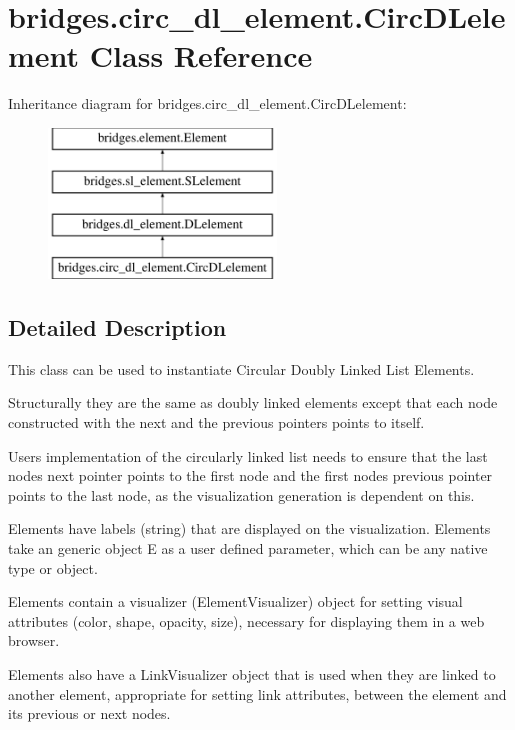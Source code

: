 \hypertarget{classbridges_1_1circ__dl__element_1_1_circ_d_lelement}{}\section{bridges.\+circ\+\_\+dl\+\_\+element.\+Circ\+D\+Lelement Class Reference}
\label{classbridges_1_1circ__dl__element_1_1_circ_d_lelement}
Inheritance diagram for bridges.\+circ\+\_\+dl\+\_\+element.\+Circ\+D\+Lelement\+:\begin{figure}[H]
\begin{center}
\leavevmode
\includegraphics[height=4.000000cm]{classbridges_1_1circ__dl__element_1_1_circ_d_lelement}
\end{center}
\end{figure}


\subsection{Detailed Description}
This class can be used to instantiate Circular Doubly Linked List Elements. 

Structurally they are the same as doubly linked elements except that each node constructed with the next and the previous pointers points to itself.

User\textquotesingle{}s implementation of the circularly linked list needs to ensure that the last node\textquotesingle{}s next pointer points to the first node and the first node\textquotesingle{}s previous pointer points to the last node, as the visualization generation is dependent on this.

Elements have labels (string) that are displayed on the visualization. Elements take an generic object E as a user defined parameter, which can be any native type or object.

Elements contain a visualizer (Element\+Visualizer) object for setting visual attributes (color, shape, opacity, size), necessary for displaying them in a web browser.

Elements also have a Link\+Visualizer object that is used when they are linked to another element, appropriate for setting link attributes, between the element and its previous or next nodes.

